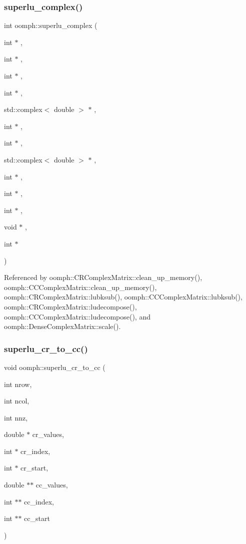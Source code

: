 \subsubsection{\texorpdfstring{superlu\+\_\+complex()}{superlu\_complex()}}
{\footnotesize\ttfamily int oomph\+::superlu\+\_\+complex (\begin{DoxyParamCaption}\item[{int $\ast$}]{,  }\item[{int $\ast$}]{,  }\item[{int $\ast$}]{,  }\item[{int $\ast$}]{,  }\item[{std\+::complex$<$ double $>$ $\ast$}]{,  }\item[{int $\ast$}]{,  }\item[{int $\ast$}]{,  }\item[{std\+::complex$<$ double $>$ $\ast$}]{,  }\item[{int $\ast$}]{,  }\item[{int $\ast$}]{,  }\item[{int $\ast$}]{,  }\item[{void $\ast$}]{,  }\item[{int $\ast$}]{ }\end{DoxyParamCaption})}



Referenced by oomph\+::\+C\+R\+Complex\+Matrix\+::clean\+\_\+up\+\_\+memory(), oomph\+::\+C\+C\+Complex\+Matrix\+::clean\+\_\+up\+\_\+memory(), oomph\+::\+C\+R\+Complex\+Matrix\+::lubksub(), oomph\+::\+C\+C\+Complex\+Matrix\+::lubksub(), oomph\+::\+C\+R\+Complex\+Matrix\+::ludecompose(), oomph\+::\+C\+C\+Complex\+Matrix\+::ludecompose(), and oomph\+::\+Dense\+Complex\+Matrix\+::scale().

\mbox{\label{namespaceoomph_ac806709e87d971d63a6a4ba4c9e0e40d}} 
\subsubsection{\texorpdfstring{superlu\+\_\+cr\+\_\+to\+\_\+cc()}{superlu\_cr\_to\_cc()}}
{\footnotesize\ttfamily void oomph\+::superlu\+\_\+cr\+\_\+to\+\_\+cc (\begin{DoxyParamCaption}\item[{int}]{nrow,  }\item[{int}]{ncol,  }\item[{int}]{nnz,  }\item[{double $\ast$}]{cr\+\_\+values,  }\item[{int $\ast$}]{cr\+\_\+index,  }\item[{int $\ast$}]{cr\+\_\+start,  }\item[{double $\ast$$\ast$}]{cc\+\_\+values,  }\item[{int $\ast$$\ast$}]{cc\+\_\+index,  }\item[{int $\ast$$\ast$}]{cc\+\_\+start }\end{DoxyParamCaption})}



